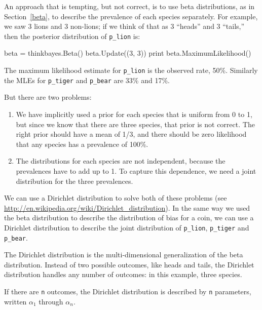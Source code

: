 \documentclass[12pt]{book}
\theoremstyle{exercise}
\newcommand{\py}[1]{{\tt #1}}%
\begin{document}
An approach that is tempting, but not correct, is to use beta
distributions, as in Section~\ref{beta}, to describe the prevalence of
each species separately.  For example, we saw 3 lions and 3 non-lions;
if we think of that as 3 ``heads'' and 3 ``tails,'' then the posterior
distribution of \verb"p_lion" is:

\begin{code}
    beta = thinkbayes.Beta()
    beta.Update((3, 3))
    print beta.MaximumLikelihood()
\end{code}

The maximum likelihood estimate for \verb"p_lion" is the observed
rate, 50\%.  Similarly the MLEs for \verb"p_tiger" and \verb"p_bear"
are 33\% and 17\%.

But there are two problems:

\begin{enumerate}

\item We have implicitly used a prior for each species that is uniform
  from 0 to 1, but since we know that there are three species, that
  prior is not correct.  The right prior should have a mean of 1/3,
  and there should be zero likelihood that any species has a
  prevalence of 100\%.

\item The distributions for each species are not independent, because
  the prevalences have to add up to 1.  To capture this dependence, we
  need a joint distribution for the three prevalences.

\end{enumerate}

We can use a Dirichlet distribution to solve both of these problems
(see \url{http://en.wikipedia.org/wiki/Dirichlet_distribution}).  In
the same way we used the beta distribution to describe the
distribution of bias for a coin, we can use a Dirichlet
distribution to describe the joint distribution of \verb"p_lion",
\verb"p_tiger" and \verb"p_bear".

The Dirichlet distribution is the multi-dimensional generalization
of the beta distribution.  Instead of two possible outcomes, like
heads and tails, the Dirichlet distribution handles any number of
outcomes: in this example, three species.

If there are \py{n} outcomes, the Dirichlet distribution is
described by \py{n} parameters, written $\alpha_1$ through $\alpha_n$.
\end{document}
